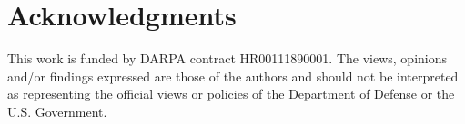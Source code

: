 \documentclass[conference]{IEEEtran}
\theoremstyle{plain}
\theoremstyle{definition}
\theoremstyle{remark}
\begin{document}
% 

% 

% 

% 

\section*{Acknowledgments}
This work is funded by DARPA contract HR00111890001. The views, opinions and/or findings expressed are those of the authors and
should not be interpreted as representing the official views or policies of the Department of Defense or the U.S. Government.

%
%


% 
% 
\end{document}
